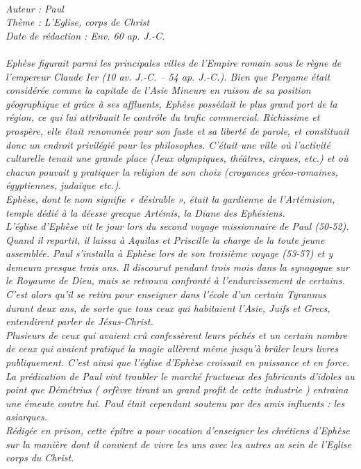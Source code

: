 \BFont
\noindent\hrulefill
{\footnotesize
\textit{
\bigskip
{\centering{}
\\Auteur : Paul
\\Thème : L'Eglise, corps de Christ
\\Date de rédaction : Env. 60 ap. J.-C.\\}
}
\textit{
\\Ephèse figurait parmi les principales villes de l'Empire romain sous le règne de l'empereur Claude Ier (10 av. J.-C. – 54 ap. J.-C.). Bien que Pergame était considérée comme la capitale de l'Asie Mineure en raison de sa position géographique et grâce à ses affluents, Ephèse possédait le plus grand port de la région, ce qui lui attribuait le contrôle du trafic commercial. Richissime et prospère, elle était renommée pour son faste et sa liberté de parole, et constituait donc un endroit privilégié pour les philosophes. C'était une ville où l'activité culturelle tenait une grande place (Jeux olympiques, théâtres, cirques, etc.) et où chacun pouvait y pratiquer la religion de son choix (croyances gréco-romaines, égyptiennes, judaïque etc.).
\\Ephèse, dont le nom signifie « désirable », était la gardienne de l'Artémision, temple dédié à la déesse grecque Artémis,
la Diane des Ephésiens.
\\L'église d'Ephèse vit le jour lors du second voyage missionnaire de Paul (50-52). Quand il repartit, il laissa à Aquilas et Priscille la charge de la toute jeune assemblée. Paul s'installa à Ephèse lors de son troisième voyage (53-57) et y demeura presque trois ans. Il discourut pendant trois mois dans la synagogue sur le Royaume de Dieu, mais se retrouva confronté à l'endurcissement de certains. C'est alors qu'il se retira pour enseigner dans l'école d'un certain Tyrannus durant deux ans, de sorte que tous ceux qui habitaient l'Asie, Juifs et Grecs, entendirent parler de Jésus-Christ.
\\Plusieurs de ceux qui avaient crû confessèrent leurs péchés et un certain nombre de ceux qui avaient pratiqué la magie allèrent même jusqu'à brûler leurs livres publiquement. C'est ainsi que l'église d'Ephèse croissait en puissance et en force. La prédication de Paul vint troubler le marché fructueux des fabricants d'idoles au point que Démétrius ( orfèvre tirant un grand profit de cette industrie ) entraina une émeute contre lui. Paul était cependant soutenu par des amis influents : les asiarques.
\\Rédigée en prison, cette épître a pour vocation d'enseigner les chrétiens d'Ephèse sur la manière dont il convient de vivre les uns avec les autres au sein de l'Eglise corps du Christ.\bigskip
}
}
